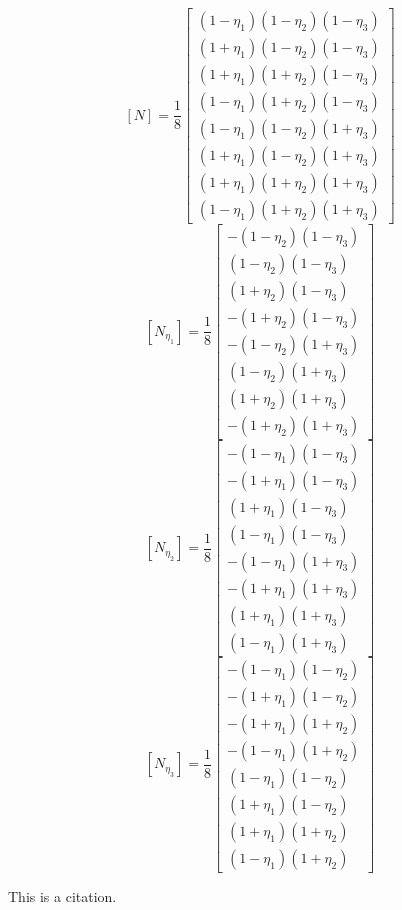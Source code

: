     \[ [N] = \frac{1}{8} \left[ \begin{array}{c}
               (1-\eta_1)(1-\eta_2)(1-\eta_3) \\
               (1+\eta_1)(1-\eta_2)(1-\eta_3) \\
               (1+\eta_1)(1+\eta_2)(1-\eta_3) \\
               (1-\eta_1)(1+\eta_2)(1-\eta_3) \\
               (1-\eta_1)(1-\eta_2)(1+\eta_3) \\
               (1+\eta_1)(1-\eta_2)(1+\eta_3) \\
               (1+\eta_1)(1+\eta_2)(1+\eta_3) \\
               (1-\eta_1)(1+\eta_2)(1+\eta_3)
            \end{array}\right]\]
    \[ [N_\eta_1] = \frac{1}{8} \left[ \begin{array}{c}
               -(1-\eta_2)(1-\eta_3) \\
                (1-\eta_2)(1-\eta_3) \\
                (1+\eta_2)(1-\eta_3) \\
               -(1+\eta_2)(1-\eta_3) \\
               -(1-\eta_2)(1+\eta_3) \\
                (1-\eta_2)(1+\eta_3) \\
                (1+\eta_2)(1+\eta_3) \\
               -(1+\eta_2)(1+\eta_3)
            \end{array}\right]\]
    \[ [N_\eta_2] = \frac{1}{8} \left[ \begin{array}{c}
               -(1-\eta_1)(1-\eta_3) \\
               -(1+\eta_1)(1-\eta_3) \\
                (1+\eta_1)(1-\eta_3) \\
                (1-\eta_1)(1-\eta_3) \\
               -(1-\eta_1)(1+\eta_3) \\
               -(1+\eta_1)(1+\eta_3) \\
                (1+\eta_1)(1+\eta_3) \\
                (1-\eta_1)(1+\eta_3)
            \end{array}\right]\]
    \[ [N_\eta_3] = \frac{1}{8} \left[ \begin{array}{c}
               -(1-\eta_1)(1-\eta_2) \\
               -(1+\eta_1)(1-\eta_2) \\
               -(1+\eta_1)(1+\eta_2) \\
               -(1-\eta_1)(1+\eta_2) \\
                (1-\eta_1)(1-\eta_2) \\
                (1+\eta_1)(1-\eta_2) \\
                (1+\eta_1)(1+\eta_2) \\
                (1-\eta_1)(1+\eta_2)
            \end{array}\right]\]

	This is a citation. \cite{bar}
